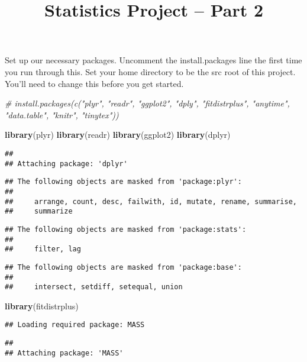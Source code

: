 \documentclass[]{article}
\title{Statistics Project -- Part 2}
\author{}
\date{}
\newenvironment{Shaded}{\begin{snugshade}}{\end{snugshade}}
\newcommand{\KeywordTok}[1]{\textcolor[rgb]{0.13,0.29,0.53}{\textbf{#1}}}
\newcommand{\CommentTok}[1]{\textcolor[rgb]{0.56,0.35,0.01}{\textit{#1}}}
\newcommand{\NormalTok}[1]{#1}
\begin{document}
\maketitle

Set up our necessary packages. Uncomment the install.packages line the
first time you run through this. Set your home directory to be the src
root of this project. You'll need to change this before you get started.

\begin{Shaded}
\begin{Highlighting}[]
\CommentTok{# install.packages(c("plyr", "readr", "ggplot2", "dply", "fitdistrplus", "anytime", "data.table", "knitr", "tinytex"))}

\KeywordTok{library}\NormalTok{(plyr)}
\KeywordTok{library}\NormalTok{(readr)}
\KeywordTok{library}\NormalTok{(ggplot2)}
\KeywordTok{library}\NormalTok{(dplyr)}
\end{Highlighting}
\end{Shaded}

\begin{verbatim}
## 
## Attaching package: 'dplyr'
\end{verbatim}

\begin{verbatim}
## The following objects are masked from 'package:plyr':
## 
##     arrange, count, desc, failwith, id, mutate, rename, summarise,
##     summarize
\end{verbatim}

\begin{verbatim}
## The following objects are masked from 'package:stats':
## 
##     filter, lag
\end{verbatim}

\begin{verbatim}
## The following objects are masked from 'package:base':
## 
##     intersect, setdiff, setequal, union
\end{verbatim}

\begin{Shaded}
\begin{Highlighting}[]
\KeywordTok{library}\NormalTok{(fitdistrplus)}
\end{Highlighting}
\end{Shaded}

\begin{verbatim}
## Loading required package: MASS
\end{verbatim}

\begin{verbatim}
## 
## Attaching package: 'MASS'
\end{verbatim}
\end{document}
